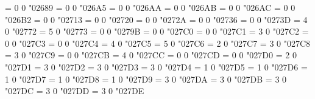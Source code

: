 \Umathchardef\blackcircledtwodots = 0 0 "02689 %
\Umathchardef\Hermaphrodite = 0 0 "026A5 %
\Umathchardef\mdwhtcircle = 0 0 "026AA %
\Umathchardef\mdblkcircle = 0 0 "026AB %
\Umathchardef\mdsmwhtcircle = 0 0 "026AC %
\Umathchardef\neuter = 0 0 "026B2 %
\Umathchardef\checkmark = 0 0 "02713 %
\Umathchardef\maltese = 0 0 "02720 %
\Umathchardef\circledstar = 0 0 "0272A %
\Umathchardef\varstar = 0 0 "02736 %
\Umathchardef\dingasterisk = 0 0 "0273D %
\Umathchardef\lbrbrak = 4 0 "02772 %
\Umathchardef\rbrbrak = 5 0 "02773 %
\Umathchardef\draftingarrow = 0 0 "0279B %
\Umathchardef\threedangle = 0 0 "027C0 %
\Umathchardef\whiteinwhitetriangle = 0 0 "027C1 %
\Umathchardef\perp = 3 0 "027C2 %
\Umathchardef\subsetcirc = 0 0 "027C3 %
\Umathchardef\supsetcirc = 0 0 "027C4 %
\Umathchardef\lbag = 4 0 "027C5 %
\Umathchardef\rbag = 5 0 "027C6 %
\Umathchardef\veedot = 2 0 "027C7 %
\Umathchardef\bsolhsub = 3 0 "027C8 %
\Umathchardef\suphsol = 3 0 "027C9 %
\Umathchardef\diagup = 0 0 "027CB %
\Umathchardef\longdivision = 4 0 "027CC %
\Umathchardef\diagdown = 0 0 "027CD %
\Umathchardef\diamondcdot = 0 0 "027D0 %
\Umathchardef\wedgedot = 2 0 "027D1 %
\Umathchardef\upin = 3 0 "027D2 %
\Umathchardef\pullback = 3 0 "027D3 %
\Umathchardef\pushout = 3 0 "027D4 %
\Umathchardef\leftouterjoin = 1 0 "027D5 %
\Umathchardef\rightouterjoin = 1 0 "027D6 %
\Umathchardef\fullouterjoin = 1 0 "027D7 %
\Umathchardef\bigbot = 1 0 "027D8 %
\Umathchardef\bigtop = 1 0 "027D9 %
\Umathchardef\DashVDash = 3 0 "027DA %
\Umathchardef\dashVdash = 3 0 "027DB %
\Umathchardef\multimapinv = 3 0 "027DC %
\Umathchardef\vlongdash = 3 0 "027DD %
\Umathchardef\longdashv = 3 0 "027DE %
